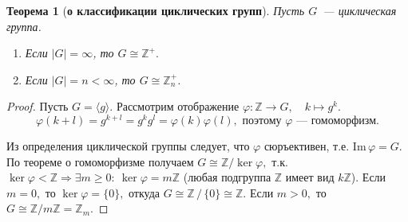 \documentclass[a4paper, 14pt]{extarticle}
\newcommand{\n}{\par}
\newcommand{\integers}{\mathbb{Z}}
\newcommand{\suchthat}{{:}{ } \ }
\newcommand{\im}{\mathrm{Im} \,}
\renewcommand{\phi}{\varphi}
\theoremstyle{definition}
\theoremstyle{plain}
\newtheorem*{theorem*}{Теорема}
\numberwithin{theorem}{section}
\numberwithin{definition}{section}
\numberwithin{statement}{section}
\numberwithin{lemma}{section}
\numberwithin{consequence}{section}
\begin{document}
	\begin{theorem*}[\textbf{о классификации циклических групп}]
		Пусть $G$~--- циклическая группа.
		\begin{enumerate}
			\setlength\itemsep{0.1em}
			\item Если $|G| = \infty$, то $G \cong \integers ^ +.$
			\item Если $|G| = n < \infty$, то $G \cong \integers_n ^ +$.
		\end{enumerate}
	\end{theorem*}
	\begin{proof}
		Пусть ${G = \langle g \rangle.}$ Рассмотрим отображение $\phi: \integers \rightarrow G, \quad k \mapsto g^k.$
		\begin{equation*}
			\phi(k + l) = g^{k+l} = g^kg^l =
			\phi(k) \phi(l), \text{ поэтому } \phi \text{~--- гомоморфизм.}
		\end{equation*} \n
		Из определения циклической группы следует, что $\phi$ сюръективен, т.е. $\im \phi = G$. По теореме о гомоморфизме получаем ${G \cong \integers/\ker \phi,}$ т.к. ${\ker \phi < \integers \Longrightarrow \exists m \geqslant 0 \suchthat \ker \phi = m \integers}$ (любая подгруппа $\integers$ имеет вид $k\integers$). Если ${m = 0},$ то ${\ker \phi = \{0\},}$ откуда ${G \cong \integers \, / \, \{0\} \cong \integers.}$ Если ${m > 0,}$ то ${G \cong \integers/m\integers = \integers_m.}$
	\end{proof}
	\newpage
\end{document}
